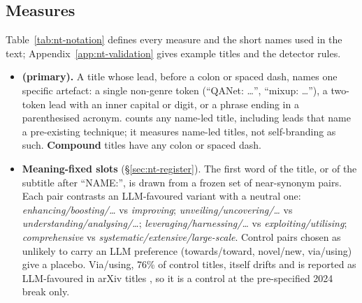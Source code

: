 \subsection{Measures}
\label{sec:nt-measures}
Table~\ref{tab:nt-notation} defines every measure and the short names used in the text; Appendix~\ref{app:nt-validation} gives example titles and the detector rules.
\begin{itemize}
\item \textbf{\NAME{} (primary).} A title whose lead, before a colon or spaced dash, names one specific artefact: a single non-genre token (``QANet: \dots'', ``mixup: \dots''), a two-token lead with an inner capital or digit, or a phrase ending in a parenthesised acronym. \NAME{} counts any name-led title, including leads that name a pre-existing technique; it measures name-led titles, not self-branding as such. \textbf{Compound} titles have any colon or spaced dash.
\item \textbf{Meaning-fixed slots} (\S\ref{sec:nt-register}). The first word of the title, or of the subtitle after ``NAME:'', is drawn from a frozen set of near-synonym pairs. Each pair contrasts an LLM-favoured variant with a neutral one: \emph{enhancing/boosting/\dots} vs \emph{improving}; \emph{unveiling/uncovering/\dots} vs \emph{understanding/analysing/\dots}; \emph{leveraging/harnessing/\dots} vs \emph{exploiting/utilising}; \emph{comprehensive} vs \emph{systematic/extensive/large-scale}. Control pairs chosen as unlikely to carry an LLM preference (towards/toward, novel/new, via/using) give a placebo. Via/using, 76\% of control titles, itself drifts and is reported as LLM-favoured in arXiv titles \citep{geng2026beyond}, so it is a control at the pre-specified 2024 break only.
\end{itemize}

